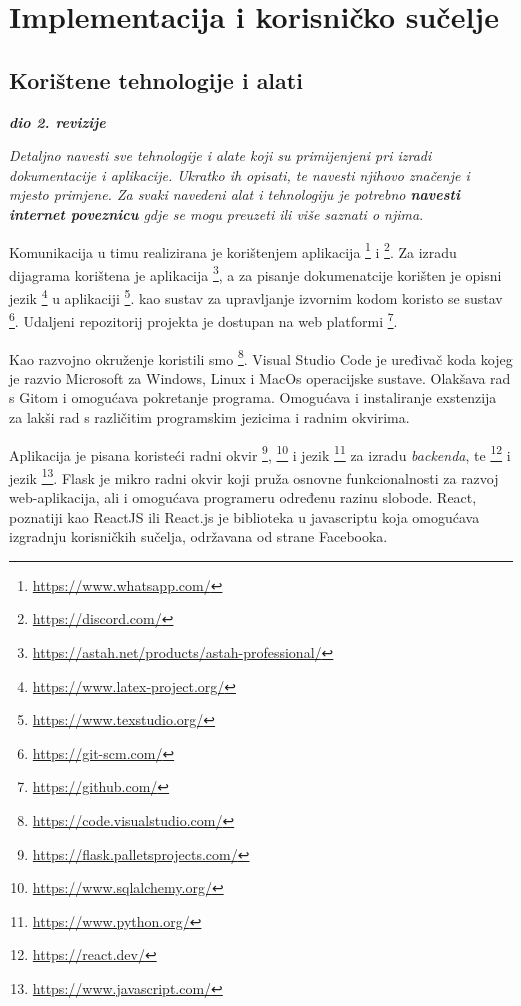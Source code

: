 \chapter{Implementacija i korisničko sučelje}
		
		
		\section{Korištene tehnologije i alati}
		
			\textbf{\textit{dio 2. revizije}}
			
			 \textit{Detaljno navesti sve tehnologije i alate koji su primijenjeni pri izradi dokumentacije i aplikacije. Ukratko ih opisati, te navesti njihovo značenje i mjesto primjene. Za svaki navedeni alat i tehnologiju je potrebno \textbf{navesti internet poveznicu} gdje se mogu preuzeti ili više saznati o njima}.
			 
			 Komunikacija u timu realizirana je korištenjem aplikacija \footnote{\url{https://www.whatsapp.com/}} i \footnote{\url{https://discord.com/}}. Za izradu dijagrama korištena je aplikacija \footnote{\url{https://astah.net/products/astah-professional/}}, a za pisanje dokumenatcije korišten je opisni jezik \footnote{\url{https://www.latex-project.org/}} u aplikaciji \footnote{\url{https://www.texstudio.org/}}. kao sustav za upravljanje izvornim kodom koristo se sustav \footnote{\url{https://git-scm.com/}}. Udaljeni repozitorij projekta je dostupan na web platformi \footnote{\url{https://github.com/}}.
			 
			 Kao razvojno okruženje koristili smo \footnote{\url{https://code.visualstudio.com/}}. Visual Studio Code je uređivač koda kojeg je razvio Microsoft za Windows, Linux i MacOs operacijske sustave. Olakšava rad s Gitom i omogućava pokretanje programa. Omogućava i instaliranje exstenzija za lakši rad s različitim programskim jezicima i radnim okvirima.
			 
			 Aplikacija je pisana koristeći radni okvir \footnote{\url{https://flask.palletsprojects.com/}}, \footnote{\url{https://www.sqlalchemy.org/}} i jezik \footnote{\url{https://www.python.org/}} za izradu \textit{backenda}, te \footnote{\url{https://react.dev/}} i jezik \footnote{\url{https://www.javascript.com/}}. Flask je mikro radni okvir koji pruža osnovne funkcionalnosti za razvoj web-aplikacija, ali i omogućava programeru određenu razinu slobode. React, poznatiji kao ReactJS ili React.js je biblioteka u javascriptu koja omogućava izgradnju korisničkih sučelja, održavana od strane Facebooka.
			 
